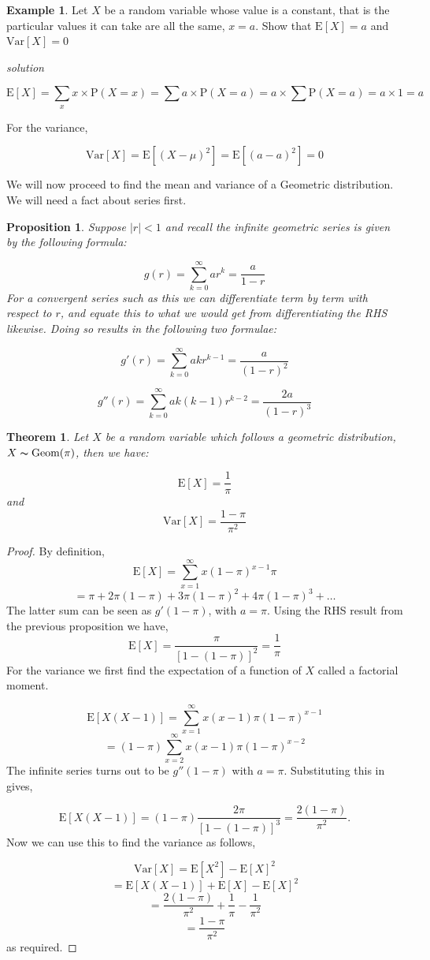 \documentclass[
]{book}
\newtheorem{theorem}{Theorem}[chapter]
\newtheorem{proposition}{Proposition}[chapter]
\theoremstyle{definition}
\theoremstyle{definition}
\newtheorem{example}{Example}[chapter]
\theoremstyle{definition}
\theoremstyle{definition}
\theoremstyle{remark}
\begin{document}
\begin{example}
Let \(X\) be a random variable whose value is a constant, that is the particular values it can take are all the same, \(x=a\). Show that \(\text{E}[X]=a\) and \(\text{Var}[X]=0\)

\emph{solution}

\[\text{E}[X]=\sum_{x}x\times\text{P}(X=x)= \sum a\times\text{P}(X=a)=a\times \sum \text{P}(X=a) = a \times 1 = a\]

For the variance,

\[ \text{Var}[X] = \text{E}[(X-\mu)^2]=\text{E}[(a-a)^2]=0 \]
\end{example}

We will now proceed to find the mean and variance of a Geometric distribution. We will need a fact about series first.

\begin{proposition}
Suppose \(|r|<1\) and recall the infinite geometric series is given by the following formula:

\[g(r) = \sum_{k=0}^{\infty}ar^{k} = \frac{a}{1-r}\]
For a convergent series such as this we can differentiate term by term with respect to \(r\), and equate this to what we would get from differentiating the RHS likewise. Doing so results in the following two formulae:

\[g'(r) = \sum_{k=0}^{\infty}akr^{k-1} = \frac{a}{(1-r)^2}\]

\[g''(r) = \sum_{k=0}^{\infty}ak(k-1)r^{k-2} = \frac{2a}{(1-r)^3}\]
\end{proposition}

\begin{theorem}
Let \(X\) be a random variable which follows a geometric distribution, \(X \thicksim \text{Geom}(\pi)\), then we have:

\[\text{E}[X] = \frac{1}{\pi}\]
and
\[ \text{Var}[X]=\frac{1-\pi}{\pi^2}\]
\end{theorem}

\begin{proof}
By definition,
\[\text{E}[X] = \sum_{x=1}^{\infty}x(1-\pi)^{x-1}\pi\]
\[ = \pi + 2\pi(1-\pi) + 3\pi(1-\pi)^2+4\pi(1-\pi)^3+ \dots \]
The latter sum can be seen as \(g'(1-\pi)\), with \(a=\pi\). Using the RHS result from the previous proposition we have,
\[\text{E}[X] = \frac{\pi}{[1-(1-\pi)]^2} = \frac{1}{\pi}\]
For the variance we first find the expectation of a function of \(X\) called a factorial moment.

\[\text{E}[X(X-1)] = \sum_{x=1}^{\infty}x(x-1)\pi(1-\pi)^{x-1}\]
\[ = (1-\pi)\sum_{x=2}^{\infty}x(x-1)\pi(1-\pi)^{x-2}\]
The infinite series turns out to be \(g''(1-\pi)\) with \(a=\pi\). Substituting this in gives,

\[\text{E}[X(X-1)]=(1-\pi)\frac{2\pi}{[1-(1-\pi)]^3} = \frac{2(1-\pi)}{\pi^2}.\]
Now we can use this to find the variance as follows,

\[\text{Var}[X] = \text{E}[X^2]-\text{E}[X]^2 \]
\[ = \text{E}[X(X-1)]+\text{E}[X]-\text{E}[X]^2 \]
\[ = \frac{2(1-\pi)}{\pi^2} + \frac{1}{\pi} - \frac{1}{\pi^2} \]
\[ = \frac{1-\pi}{\pi^2}\]
as required.
\end{proof}
\end{document}

